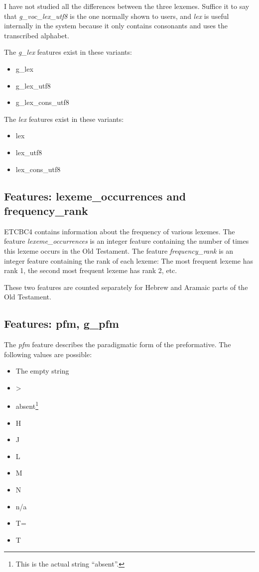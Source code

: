 \documentclass[11pt,oneside,a4paper]{memoir}
\begin{document}
I have not studied all the differences between the three lexemes. Suffice it to say that
\emph{g\_voc\_lex\_utf8} is the one normally shown to users, and \emph{lex} is useful
internally in the system because it only contains consonants and uses the transcribed alphabet.

The \emph{g\_lex} features exist in these variants:

\begin{itemize}
\item g\_lex
\item g\_lex\_utf8
\item g\_lex\_cons\_utf8
\end{itemize}

The \emph{lex} features exist in these variants:

\begin{itemize}
\item lex
\item lex\_utf8
\item lex\_cons\_utf8
\end{itemize}

\subsection{Features: lexeme\_occurrences and frequency\_rank}

ETCBC4 contains information about the frequency of various lexemes. The feature
\emph{lexeme\_occurrences} is an integer feature containing the number of times this lexeme
occurs in the Old Testament. The feature \emph{frequency\_rank} is an integer feature containing the
rank of each lexeme: The most frequent lexeme has rank 1, the second most frequent lexeme has rank
2, etc.

These two features are counted separately for Hebrew and Aramaic parts of the Old Testament. 


\subsection{Features: pfm, g\_pfm}

The \emph{pfm} feature describes the paradigmatic form of the preformative. The following values are
possible:

\begin{itemize}
\item The empty string
\item >
\item absent\footnote{This is the actual string ``absent''.}
\item H
\item J
\item L
\item M
\item N
\item n/a
\item T=
\item T
\end{itemize}
\end{document}
